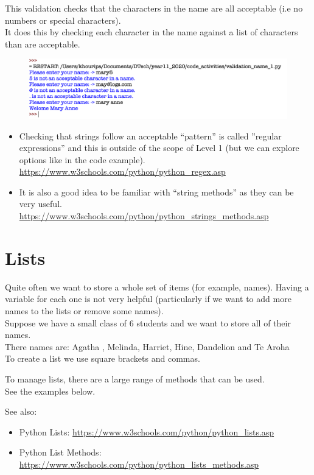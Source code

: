 \documentclass[a4paper,12pt]{article}
\begin{document}
This validation checks that the characters in the name are all acceptable (i.e no numbers or special characters).\\
It does this by checking each character in the name against a list of characters than are acceptable.

 
\begin{figure} [!h]
	\centering
	\includegraphics[width=17cm]{screen_shots/validation_name_1.png}
\end{figure}
 
 \begin{itemize}
 	\item Checking that strings follow an acceptable ``pattern'' is called ''regular expressions'' and this is outside of the scope of Level 1 (but we can explore options like in the code example).\\
 	\url{https://www.w3schools.com/python/python_regex.asp}
 	\item It is also a good idea to be familiar with ``string methods'' as they can be very useful.\\
 	\url{https://www.w3schools.com/python/python_strings_methods.asp}
 \end{itemize}




\newpage
\section{Lists}
Quite often we want to store a whole set of items (for example, names). Having a variable for each one is not very helpful (particularly if we want to add more names to the lists or remove some names).\\
Suppose we have a small class of 6 students and we want to store all of their names.\\
There names are: Agatha , Melinda, Harriet, Hine, Dandelion and Te Aroha\\
To create a list we use square brackets and commas.

To manage lists, there are a large range of methods that can be used.\\
See the examples below.

See also:
\begin{itemize}
	\item Python Lists:  \url{https://www.w3schools.com/python/python_lists.asp}
	\item Python List Methods: \url{https://www.w3schools.com/python/python_lists_methods.asp}
\end{itemize}
\end{document}
